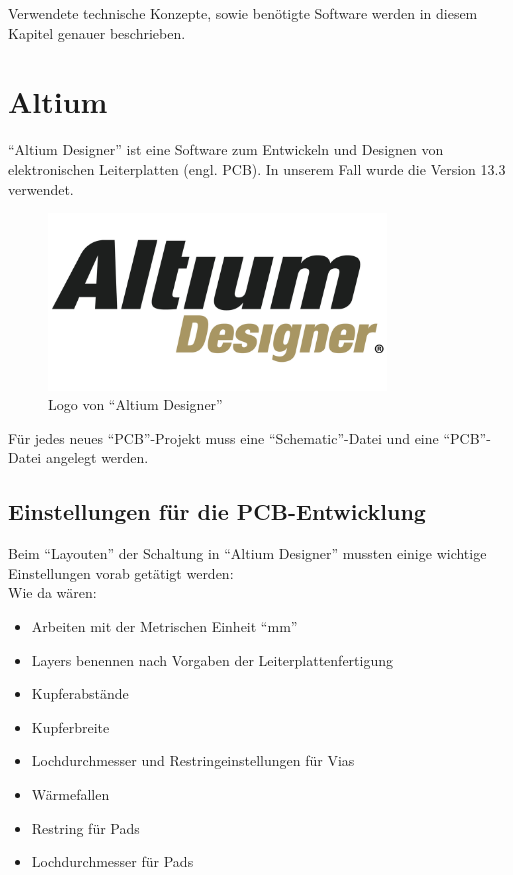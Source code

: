 Verwendete technische Konzepte, sowie benötigte Software werden in diesem Kapitel genauer beschrieben.

\section{Altium}\label{sec:3.1}
\enquote{Altium Designer} ist eine Software zum Entwickeln und Designen von elektronischen Leiterplatten (engl. PCB).
In unserem Fall wurde die Version 13.3 verwendet. 
\begin{figure} [H]
	\centering
	\includegraphics[width=0.8\textwidth]{img/Grundlagen/Altium/ad_logo.png}
	\caption[Logo von \enquote{Altium Designer}]{Logo von \enquote{Altium Designer}\footnotemark}
	\label{fig:3.1.1}
\end{figure}
Für jedes neues \enquote{PCB}-Projekt muss eine \enquote{Schematic}-Datei und eine \enquote{PCB}-Datei angelegt werden.

\newpage
\subsection{Einstellungen für die PCB-Entwicklung}\label{subsec:3.1.1}
Beim \enquote{Layouten} der Schaltung in \enquote{Altium Designer} mussten einige wichtige Einstellungen vorab getätigt werden:\\
Wie da wären:
\begin{itemize}
	\item Arbeiten mit der Metrischen Einheit \enquote{mm}
	\item Layers benennen nach Vorgaben der Leiterplattenfertigung
	\item Kupferabstände
	\item Kupferbreite
	\item Lochdurchmesser und Restringeinstellungen für Vias
	\item Wärmefallen
	\item Restring für Pads
	\item Lochdurchmesser für Pads
\end{itemize}


